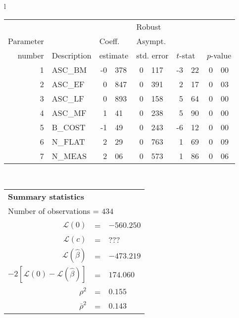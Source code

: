   \begin{tabular}{l}
\begin{tabular}{rlr@{.}lr@{.}lr@{.}lr@{.}l}
         &                       &   \multicolumn{2}{l}{}    & \multicolumn{2}{l}{Robust}  &     \multicolumn{4}{l}{}   \\
Parameter &                       &   \multicolumn{2}{l}{Coeff.}      & \multicolumn{2}{l}{Asympt.}  &     \multicolumn{4}{l}{}   \\
number &  Description                     &   \multicolumn{2}{l}{estimate}      & \multicolumn{2}{l}{std. error}  &   \multicolumn{2}{l}{$t$-stat}  &   \multicolumn{2}{l}{$p$-value}   \\

\hline

1 & ASC\_BM & -0&378 & 0&117 & -3&22 & 0&00 \\
2 & ASC\_EF & 0&847 & 0&391 & 2&17 & 0&03 \\
3 & ASC\_LF & 0&893 & 0&158 & 5&64 & 0&00 \\
4 & ASC\_MF & 1&41 & 0&238 & 5&90 & 0&00 \\
5 & B\_COST & -1&49 & 0&243 & -6&12 & 0&00 \\
\hline
6 & N\_FLAT & 2&29 & 0&763 & 1&69\footnotemark[1] & 0&09 \\
7 & N\_MEAS & 2&06 & 0&573 & 1&86\footnotemark[1] & 0&06 \\
\hline

\end{tabular}
\\
\begin{tabular}{rcl}
\multicolumn{3}{l}{\bf Summary statistics}\\
\multicolumn{3}{l}{ Number of observations = $434$} \\
 $\mathcal{L}(0)$ &=&  $-560.250$ \\
 $\mathcal{L}(c)$ &=& ???\\
 $\mathcal{L}(\hat{\beta})$ &=& $-473.219 $  \\
 $-2[\mathcal{L}(0) -\mathcal{L}(\hat{\beta})]$ &=& $174.060$ \\
    $\rho^2$ &=&   $0.155$ \\
    $\bar{\rho}^2$ &=&    $0.143$ \\
\end{tabular}
\end{tabular}


